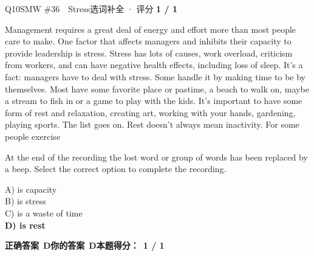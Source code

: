 \begin{qblock}{Q10\quad SMW \#36\ \ Stress}{选词补全 · 评分 \textcolor{cAccent}{\bfseries 1 / 1}}
\begin{promptbox}
Management requires a great deal of energy and effort more than most people care to make. One factor that affects managers and inhibits their capacity to provide leadership is stress. Stress has lots of causes, work overload, criticism from workers, and can have negative health effects, including loss of sleep. It's a fact: managers have to deal with stress. Some handle it by making time to be by themselves. Most have some favorite place or pastime, a beach to walk on, maybe a stream to fish in or a game to play with the kids. It's important to have some form of rest and relaxation, creating art, working with your hands, gardening, playing sports. The list goes on. Rest doesn't always mean inactivity. For some people exercise \underline{\hspace{2.2cm}}
\end{promptbox}
\begin{notebox}At the end of the recording the lost word or group of words has been replaced by a beep. Select the correct option to complete the recording.\end{notebox}
{\small
A) is capacity\\
B) is stress\\
C) is a waste of time\\
{\color{cFix}\textbf{D) is rest}}}
\par\smallskip
\textbf{正确答案}\ \textcolor{cFix}{\bfseries D}\qquad\textbf{你的答案}\ \textcolor{cFix}{\bfseries D}\qquad\textbf{本题得分：}\ {\color{cAccent}\bfseries 1 / 1}
\end{qblock}

